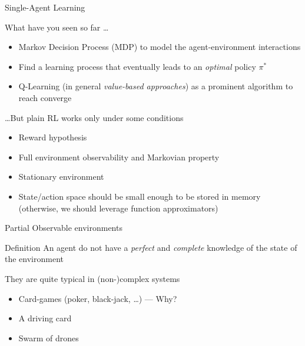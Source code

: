 \documentclass[presentation]{beamer}\mode<presentation>{\usetheme{AMSBolognaFC}}
\begin{document}
\begin{frame}[c, fragile]{Single-Agent Learning}
\begin{exampleblock}{What have you seen so far \dots}
	\begin{itemize}
		\item Markov Decision Process (MDP) to model the agent-environment interactions
		\item Find a learning process that eventually leads to an \emph{optimal} policy $\pi^*$
		\item Q-Learning (in general \emph{value-based approaches}) as a prominent algorithm to reach converge
	\end{itemize}
\end{exampleblock}
\begin{alertblock}{\dots But plain RL works only under some conditions}
	\begin{itemize}
		\item Reward hypothesis
		\item Full environment observability and Markovian property
		\item Stationary environment
		\item State/action space should be small enough to be stored in memory (otherwise, we should leverage function approximators)
	\end{itemize}	
\end{alertblock}
\end{frame}
\begin{frame}{Partial Observable environments}
	\begin{alertblock}{Definition}
		An agent do not have a \emph{perfect} and \emph{complete} knowledge of the state of the environment
	\end{alertblock}
	\begin{exampleblock}{They are quite typical in (non-)complex systems}
		\begin{itemize}
			\item Card-games (poker, black-jack, \dots) --- Why?
			\item A driving card
			\item Swarm of drones
		\end{itemize}
	\end{exampleblock}
\end{frame}
\end{document}
